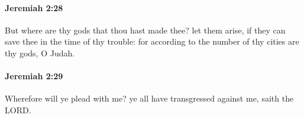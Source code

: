 		\paragraph{Jeremiah 2:28} %
			\label{JEREMIAH-2-28}

			But where are thy gods that thou hast made thee? let them arise, if they can save thee in the time of thy trouble: for according to the number of thy cities are thy gods, O Judah.


		\paragraph{Jeremiah 2:29} %
			\label{JEREMIAH-2-29}

			Wherefore will ye plead with me? ye all have transgressed against me, saith the LORD.


